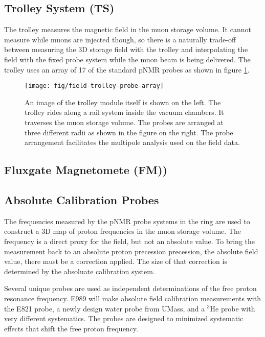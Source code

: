 
\subsection{Trolley System (TS)}

The trolley measures the magnetic field in the muon storage volume.  It cannot measure while muons are injected though, so there is a naturally trade-off between measuring the 3D storage field with the trolley and interpolating the field with the fixed probe system while the muon beam is being delivered.  The trolley uses an array of 17 of the standard pNMR probes as shown in figure \ref{fig:field-trolley-probe-array}.

\begin{figure}
\label{fig:field-trolley-probe-array}
\texttt{[image: fig/field-trolley-probe-array]}
\caption{An image of the trolley module itself is shown on the left.  The trolley rides along a rail system inside the vacuum chambers.  It traverses the muon storage volume.  The probes are arranged at three different radii as shown in the figure on the right.  The probe arrangement facilitates the multipole analysis used on the field data.}
\end{figure}

\subsection{Fluxgate Magnetomete (FM))}


\subsection{Absolute Calibration Probes}

The frequencies measured by the pNMR probe systems in the ring are used to construct a 3D map of proton frequencies in the muon storage volume.  The frequency is a direct proxy for the field, but not an absolute value.  To bring the measurement back to an absolute proton precession precession, the absolute field value, there must be a correction applied.  The size of that correction is determined by the absoluate calibration system.

Several unique probes are used as independent determinations of the free proton resonance frequency.  E989 will make absolute field calibration measurements with the E821 probe, a newly design water probe from UMass, and a $\mathrm{^3He}$ probe with very different systematics. The probes are designed to minimized systematic effects that shift the free proton frequency.

